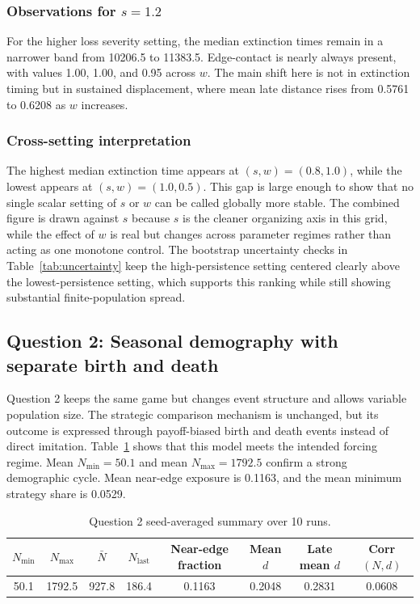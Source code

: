 \documentclass[11pt,a4paper]{article}
\begin{document}
\subsubsection*{Observations for $s=1.2$}
For the higher loss severity setting, the median extinction times remain in a narrower band from 10206.5 to 11383.5. Edge-contact is nearly always present, with values 1.00, 1.00, and 0.95 across $w$. The main shift here is not in extinction timing but in sustained displacement, where mean late distance rises from 0.5761 to 0.6208 as $w$ increases.

\subsubsection*{Cross-setting interpretation}
The highest median extinction time appears at $(s,w)=(0.8,1.0)$, while the lowest appears at $(s,w)=(1.0,0.5)$. This gap is large enough to show that no single scalar setting of $s$ or $w$ can be called globally more stable. The combined figure is drawn against $s$ because $s$ is the cleaner organizing axis in this grid, while the effect of $w$ is real but changes across parameter regimes rather than acting as one monotone control.
The bootstrap uncertainty checks in Table~\ref{tab:uncertainty} keep the high-persistence setting centered clearly above the lowest-persistence setting, which supports this ranking while still showing substantial finite-population spread.

\subsection{Question 2: Seasonal demography with separate birth and death}
Question 2 keeps the same game but changes event structure and allows variable population size. The strategic comparison mechanism is unchanged, but its outcome is expressed through payoff-biased birth and death events instead of direct imitation. Table~\ref{tab:q2} shows that this model meets the intended forcing regime. Mean $N_{\min}=50.1$ and mean $N_{\max}=1792.5$ confirm a strong demographic cycle. Mean near-edge exposure is 0.1163, and the mean minimum strategy share is 0.0529.

\begin{table}[!htbp]
\centering
\caption{Question 2 seed-averaged summary over 10 runs.}
\label{tab:q2}
\begin{tabular}{cccccccc}
\toprule
$N_{\min}$ & $N_{\max}$ & $\bar N$ & $N_{\text{last}}$ & Near-edge fraction & Mean $d$ & Late mean $d$ & Corr$(N,d)$ \\
\midrule
50.1 & 1792.5 & 927.8 & 186.4 & 0.1163 & 0.2048 & 0.2831 & 0.0608 \\
\bottomrule
\end{tabular}
\end{table}
\end{document}

